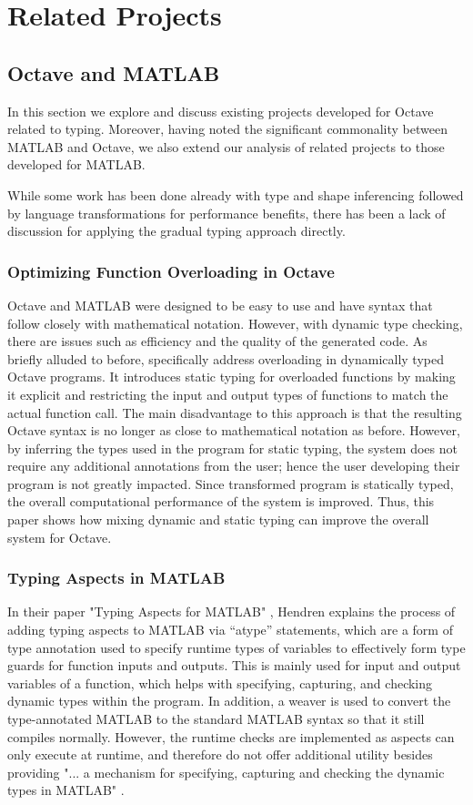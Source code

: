 \section{Related Projects}
\subsection{Octave and MATLAB}
 In this section we explore and discuss existing projects developed for Octave related to typing. Moreover, having noted the significant commonality between MATLAB and Octave, we also extend our analysis of related projects to those developed for MATLAB.
 
 While some work has been done already with type and shape inferencing followed by language transformations for performance benefits, there has been a lack of discussion for applying the gradual typing approach directly.

\subsubsection{Optimizing Function Overloading in Octave}
Octave and MATLAB were designed to be easy to use and have syntax that follow closely with mathematical notation. However, with dynamic type checking, there are issues such as efficiency and the quality of the generated code. As briefly alluded to before, \citet{olmos2003turning} specifically address overloading in dynamically typed Octave programs. It introduces static typing for overloaded functions by making it explicit and restricting the input and output types of functions to match the actual function call. The main disadvantage to this approach is that the resulting Octave syntax is no longer as close to mathematical notation as before. However, by inferring the types used in the program for static typing, the system does not require any additional annotations from the user; hence the user developing their program is not greatly impacted. Since transformed program is statically typed, the overall computational performance of the system is improved. Thus, this paper shows how mixing dynamic and static typing can improve the overall system for Octave.

\subsubsection{Typing Aspects in MATLAB}
 In their paper "Typing Aspects for MATLAB" \cite{hendren2011typing}, Hendren explains the process of adding typing aspects to MATLAB via ``atype'' statements, which are a form of type annotation used to specify runtime types of variables to effectively form type guards for function inputs and outputs. This is mainly used for input and output variables of a function, which helps with specifying, capturing, and checking dynamic types within the program. In addition, a weaver is used to convert the type-annotated MATLAB to the standard MATLAB syntax so that it still compiles normally. However, the runtime checks are implemented as aspects can only execute at runtime, and therefore do not offer additional utility besides providing "... a mechanism for specifying, capturing and checking the dynamic types in MATLAB" \cite{hendren2011typing}.

